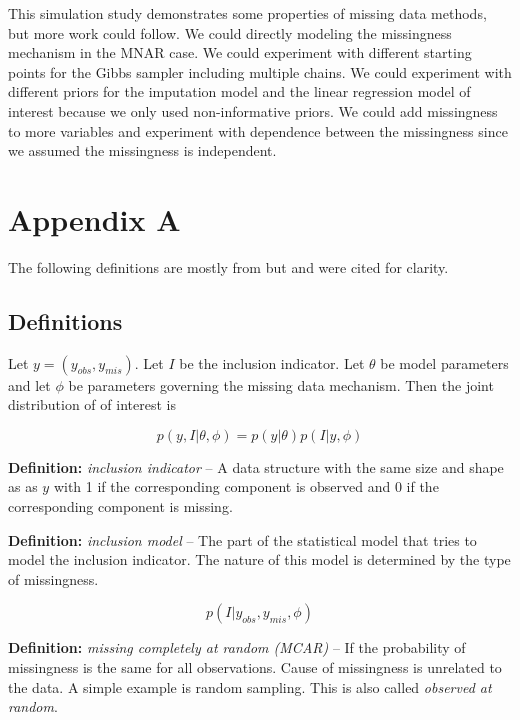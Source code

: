 \documentclass[11pt]{article}
\begin{document}
This simulation study demonstrates some properties of missing data methods, but more work could follow. We could directly modeling the missingness mechanism in the MNAR case. We could experiment with different starting points for the Gibbs sampler including multiple chains. We could experiment with different priors for the imputation model and the linear regression model of interest because we only used non-informative priors. We could add missingness to more variables and experiment with dependence between the missingness since we assumed the missingness is independent.  

\newpage
\section{Appendix A}

The following definitions are mostly from \cite{gelman2021} but \cite{little2020} and \cite{vanBurren2018} were cited for clarity. 

\subsection{Definitions}

Let $y = (y_{obs}, y_{mis})$. Let $I$ be the inclusion indicator. Let $\theta$ be model parameters and let $\phi$ be parameters governing the missing data mechanism. Then the joint distribution of of interest is 

$$p(y, I|\theta, \phi) = p(y|\theta)p(I|y, \phi)$$

\vspace{0.25in}

\textbf{Definition:} \textit{inclusion indicator} -- A data structure with the same size and shape as as $y$ with 1 if the corresponding component is observed and 0 if the corresponding component is missing.

\vspace{0.25in}

\textbf{Definition:} \textit{inclusion model} -- The part of the statistical model that tries to model the inclusion indicator. The nature of this model is determined by the type of missingness. 

$$p(I|y_{obs}, y_{mis}, \phi)$$

\vspace{0.25in}

\textbf{Definition:} \textit{missing completely at random (MCAR)} -- If the probability of missingness is the same for all observations. Cause of missingness is unrelated to the data. A simple example is random sampling. This is also called \textit{observed at random}.
\end{document}
